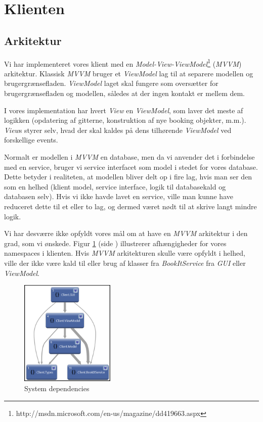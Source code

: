 \section{Klienten}
\label{Technical_Client}
\subsection{Arkitektur}
\label{Technical_Client_Archi}
Vi har implementeret vores klient med en \textit{Model-View-ViewModel}\footnote{http://msdn.microsoft.com/en-us/magazine/dd419663.aspx} (\textit{MVVM}) arkitektur. Klassisk \textit{MVVM} bruger et \textit{ViewModel} lag til at separere modellen og brugergrænsefladen. \textit{ViewModel} laget skal fungere som oversætter for brugergrænsefladen og modellen, således at der ingen kontakt er mellem dem. 

I vores implementation har hvert \textit{View} en \textit{ViewModel}, som laver det meste af logikken (opdatering af gitterne, konstruktion af nye booking objekter, m.m.). \textit{View}s styrer selv, hvad der skal kaldes på dens tilhørende \textit{ViewModel} ved forskellige events.

Normalt er modellen i \textit{MVVM} en database, men da vi anvender det i forbindelse med en service, bruger vi service interfacet som model i stedet for vores database. Dette betyder i realiteten, at modellen bliver delt op i fire lag, hvis man ser den som en helhed (klient model, service interface, logik til databasekald og databasen selv). Hvis vi ikke havde lavet en service, ville man kunne have reduceret dette til et eller to lag, og dermed været nødt til at skrive langt mindre logik.

Vi har desværre ikke opfyldt vores mål om at have en \textit{MVVM} arkitektur i den grad, som vi ønskede. Figur \ref{Fig:Technical_Client_Archi_nsd} (side \pageref{Fig:Technical_Client_Archi_nsd}) illustrerer afhængigheder for vores namespaces i klienten. Hvis \textit{MVVM} arkitekturen skulle være opfyldt i helhed, ville der ikke være kald til eller brug af klasser fra \textit{BookItService} fra \textit{GUI} eller \textit{ViewModel}.

\begin{figure}[h!]
  \centering
    \includegraphics[width=0.4\textwidth]{Chapters/Design/Technical/Images/NamespaceDependencies}
  \caption{System dependencies}
\label{Fig:Technical_Client_Archi_nsd}
\end{figure}

